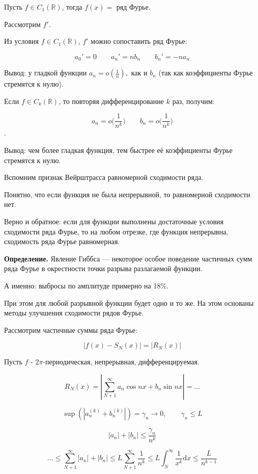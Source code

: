 \documentclass[12pt]{article}
\newcommand{\real}{\ensuremath{\mathbb{R}}}
\newcommand{\dd}{\ensuremath{\mathrm{d}}}
\begin{document}
Пусть $f \in C_1(\real)$, тогда $f(x) = $ ряд Фурье.

Рассмотрим $f'$.

Из условия $f \in C_1(\real)$, $f'$ можно сопоставить ряд Фурье:

$$a_0' = 0 \qquad a_n' = n b_n \qquad b_n' = -n a_n$$

Вывод: у гладкой функции $a_n = o(\frac{1}{n}),$ как и $ b_n$ (так как коэффициенты Фурье стремятся к нулю).


Если $f \in C_k(\real)$, то повторяя дифференцирование $k$ раз, получим:

$$a_n = o \big( \frac{1}{n^k} \big) \qquad b_n = o \big( \frac{1}{n^k} \big) $$.

Вывод: чем более гладкая функция, тем быстрее её коэффициенты Фурье стремятся к нулю.

\vline


Вспомним признак Вейрштрасса равномерной сходимости ряда.

Понятно, что  если функция не была непрерывной, то равномерной сходимости нет.

Верно и обратное: если для функции выполнены достаточные условия сходимости ряда Фурье, то на любом отрезке, где функция непрерывна, сходимость ряда Фурье равномерная.

\vspace{2em}

\textbf{Определение.} Явление Гиббса — некоторое особое поведение частичных сумм ряда Фурье в окрестности точки разрыва разлагаемой функции.

А именно: выбросы по амплитуде примерно на 18\%.

При этом для любой разрывной функции будет одно и то же. На этом основаны методы улучшения сходимости рядов Фурье.

\newpage

Рассмотрим частичные суммы ряда Фурье:

$$|f(x) - S_N(x)| = |R_N(x)|$$

Пусть $f$ - $2\pi$-периодическая, непрерывная, дифференцируемая.

$$R_N(x) = |\sum_{N+1}^{\infty} a_n\cos{nx} + b_n\sin{nx}| = \dots $$

$$\sup(|a_n^{(k)}+b_n^{(k)}|) = \gamma_n \rightarrow 0, \qquad \gamma_n \le L$$

$$|a_n| + |b_n| \le \frac{\gamma_n}{n^k}$$

$$ \dots \le \sum_{N+1}^{\infty} |a_n| + |b_n|  \le L \sum_{N+1}^{\infty} \frac{1}{n^k} \le L \int_{N}^{\infty} \frac{1}{x^k} \dd x \le \frac{L}{n^{k-1}}$$
\end{document}
